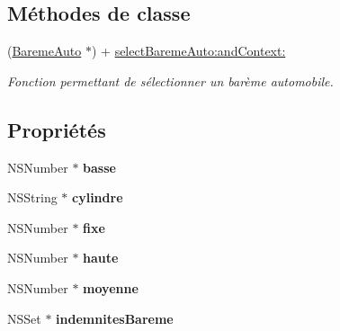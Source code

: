 \subsection*{Méthodes de classe}
\begin{DoxyCompactItemize}
\item 
(\hyperlink{interface_bareme_auto}{Bareme\+Auto} $\ast$) + \hyperlink{interface_bareme_auto_ae513644bd10af97e9f20f567d8b8d3de}{select\+Bareme\+Auto\+:and\+Context\+:}
\begin{DoxyCompactList}\small\item\em Fonction permettant de sélectionner un barème automobile. \end{DoxyCompactList}\end{DoxyCompactItemize}
\subsection*{Propriétés}
\begin{DoxyCompactItemize}
\item 
\hypertarget{interface_bareme_auto_a3ded0b229f5a256476eec5bbad187709}{}N\+S\+Number $\ast$ {\bfseries basse}\label{interface_bareme_auto_a3ded0b229f5a256476eec5bbad187709}

\item 
\hypertarget{interface_bareme_auto_aab67d35e85ffbdbb20f01f411e0a6ca3}{}N\+S\+String $\ast$ {\bfseries cylindre}\label{interface_bareme_auto_aab67d35e85ffbdbb20f01f411e0a6ca3}

\item 
\hypertarget{interface_bareme_auto_ae27f1a563aaae5c5c35407b5a16e65ed}{}N\+S\+Number $\ast$ {\bfseries fixe}\label{interface_bareme_auto_ae27f1a563aaae5c5c35407b5a16e65ed}

\item 
\hypertarget{interface_bareme_auto_ab700b9e96b09804e7e07058013f7bcd1}{}N\+S\+Number $\ast$ {\bfseries haute}\label{interface_bareme_auto_ab700b9e96b09804e7e07058013f7bcd1}

\item 
\hypertarget{interface_bareme_auto_ad1753e63c68a2df2263c21657ce1a6fe}{}N\+S\+Number $\ast$ {\bfseries moyenne}\label{interface_bareme_auto_ad1753e63c68a2df2263c21657ce1a6fe}

\item 
\hypertarget{interface_bareme_auto_a6bfc3cb430936941ad90d249e0e06c38}{}N\+S\+Set $\ast$ {\bfseries indemnites\+Bareme}\label{interface_bareme_auto_a6bfc3cb430936941ad90d249e0e06c38}

\end{DoxyCompactItemize}



